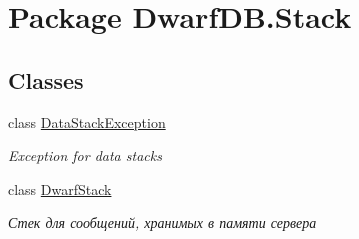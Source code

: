 \hypertarget{namespace_dwarf_d_b_1_1_stack}{\section{Package Dwarf\+D\+B.\+Stack}
\label{namespace_dwarf_d_b_1_1_stack}
}
\subsection*{Classes}
\begin{DoxyCompactItemize}
\item 
class \hyperlink{class_dwarf_d_b_1_1_stack_1_1_data_stack_exception}{Data\+Stack\+Exception}
\begin{DoxyCompactList}\small\item\em Exception for data stacks \end{DoxyCompactList}\item 
class \hyperlink{class_dwarf_d_b_1_1_stack_1_1_dwarf_stack}{Dwarf\+Stack}
\begin{DoxyCompactList}\small\item\em Стек для сообщений, хранимых в памяти сервера \end{DoxyCompactList}\end{DoxyCompactItemize}
